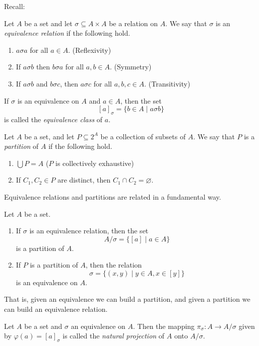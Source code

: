 \documentclass{article}
\begin{document}

Recall:

\begin{dfn}
Let $A$ be a set and let $\sigma \subseteq A \times A$ be a relation on $A$. We say that $\sigma$ is an \emph{equivalence relation} if the following hold.
\begin{enumerate}
\item $a \sigma a$ for all $a \in A$. (Reflexivity)
\item If $a \sigma b$ then $b \sigma a$ for all $a,b \in A$. (Symmetry)
\item If $a \sigma b$ and $b \sigma c$, then $a \sigma c$ for all $a,b,c \in A$. (Transitivity)
\end{enumerate}
If $\sigma$ is an equivalence on $A$ and $a \in A$, then the set \[ [a]_\sigma = \{ b \in A \mid a \sigma b \} \] is called the \emph{equivalence class} of $a$.
\end{dfn}

\begin{dfn}[Partition]
Let $A$ be a set, and let $P \subseteq 2^A$ be a collection of subsets of $A$. We say that $P$ is a \emph{partition} of $A$ if the following hold.
\begin{enumerate}
\item $\bigcup P = A$ ($P$ is collectively exhaustive)
\item If $C_1, C_2 \in P$ are distinct, then $C_1 \cap C_2 = \varnothing$.
\end{enumerate}
\end{dfn}

Equivalence relations and partitions are related in a fundamental way.

\begin{thm}
Let $A$ be a set.
\begin{enumerate}
\item If $\sigma$ is an equivalence relation, then the set \[ A/\sigma = \{ [a] \mid a \in A \} \] is a partition of $A$.
\item If $P$ is a partition of $A$, then the relation \[ \sigma = \{ (x,y) \mid y \in A, x \in [y] \} \] is an equivalence on $A$.
\end{enumerate}
\end{thm}

That is, given an equivalence we can build a partition, and given a partition we can build an equivalence relation.

\begin{dfn}
Let $A$ be a set and $\sigma$ an equivalence on $A$. Then the mapping $\pi_\sigma : A \rightarrow A/\sigma$ given by $\varphi(a) = [a]_\sigma$ is called the \emph{natural projection} of $A$ onto $A/\sigma$.
\end{dfn}
\end{document}
